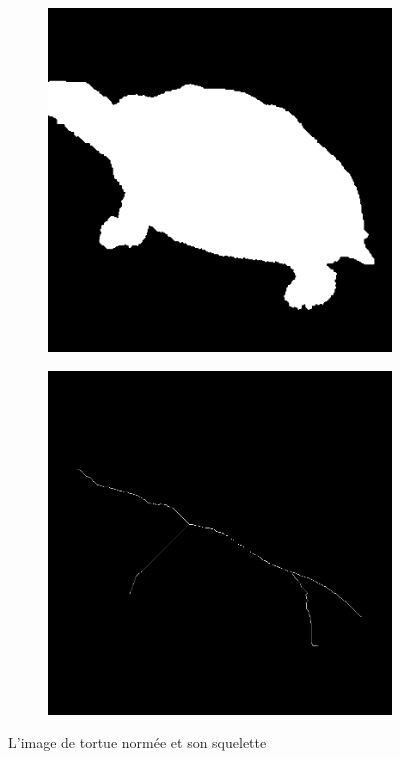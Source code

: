 \documentclass{article}
\theoremstyle{definition}
\begin{document}
     \begin{figure}[!h]
	\centering
	\begin{subfigure}{.45\textwidth}
	  \centering
	  \includegraphics[scale=0.25]{Illustrations/turtle.png}
	  \label{pocket-non-rempli}
	\end{subfigure}
	\begin{subfigure}{.45\textwidth}
	  \centering
	  \includegraphics[scale=0.25]{Illustrations/turtlesk.png}
	\label{pocket-rempli}
	\end{subfigure}
	\caption{L'image de tortue normée et son squelette}
	\label{skelton}
      \end{figure}
      
\end{document}
